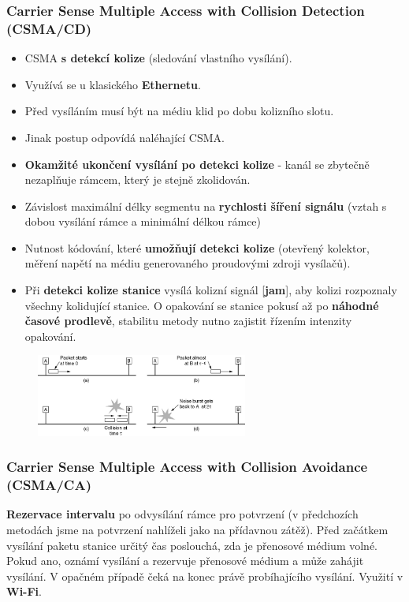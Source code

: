 \subsubsection{Carrier Sense Multiple Access with Collision Detection (CSMA/CD)}
\begin{itemize}
\item CSMA \textbf{s detekcí kolize} (sledování vlastního vysílání).
\item Využívá se u klasického \textbf{Ethernetu}.
\item Před vysíláním musí být na médiu klid po dobu kolizního slotu.
\item Jinak postup odpovídá naléhající CSMA.
\item \textbf{Okamžité ukončení vysílání po detekci kolize} - kanál se zbytečně nezaplňuje rámcem, který je stejně zkolidován.
\item Závislost maximální délky segmentu na \textbf{rychlosti šíření signálu} (vztah s dobou vysílání rámce a minimální délkou rámce)
\item Nutnost kódování, které \textbf{umožňují detekci kolize} (otevřený kolektor, měření napětí na médiu generovaného proudovými zdroji vysílačů).
\item Při \textbf{detekci kolize stanice }vysílá kolizní signál [\textbf{jam}], aby kolizi rozpoznaly všechny kolidující stanice. O opakování se stanice pokusí až po \textbf{náhodné časové prodlevě}, stabilitu metody nutno zajistit řízením intenzity opakování.
\end{itemize}

\begin{figure}[H]
	\centering
	\includegraphics[width=0.62\textwidth]{assets/csma-cd-casovani_kolize}
\end{figure}

\subsubsection{Carrier Sense Multiple Access with Collision Avoidance (CSMA/CA)}
\textbf{Rezervace intervalu} po odvysílání rámce pro potvrzení (v předchozích metodách jsme na potvrzení nahlíželi jako na  přídavnou zátěž). Před začátkem vysílání paketu stanice určitý čas poslouchá, zda je přenosové médium volné. Pokud ano, oznámí vysílání a rezervuje přenosové médium a může zahájit vysílání. V opačném případě čeká na konec právě probíhajícího vysílání. Využití v \textbf{Wi-Fi}.
